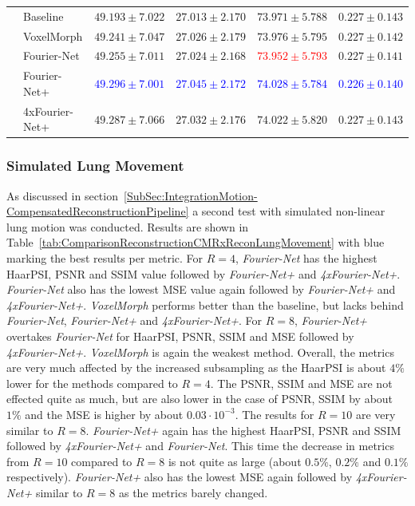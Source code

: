 \begin{table}[H]
\begin{tabularx}{\textwidth}{c Y Y Y Y Y}
		\midrule		
		 & Baseline & $49.193 \pm 7.022$ & $27.013 \pm 2.170$ & $73.971 \pm 5.788$ & $0.227 \pm 0.143$ \\  
		 & VoxelMorph & $49.241 \pm 7.047$ & $27.026 \pm 2.179$ & $73.976 \pm 5.795$ & $0.227 \pm 0.142$ \\  
		 & Fourier-Net & $49.255 \pm 7.011$ & $27.024 \pm 2.168$ & \textcolor{red}{$73.952 \pm 5.793$} & $0.227 \pm 0.141$ \\  
		 & Fourier-Net+ & \textcolor{blue}{$49.296 \pm 7.001$} & \textcolor{blue}{$27.045 \pm 2.172$} & \textcolor{blue}{$74.028 \pm 5.784$} & \textcolor{blue}{$0.226 \pm 0.140$} \\   
		 & \mbox{4xFourier-Net+} & $49.287 \pm 7.066$ & $27.032 \pm 2.176$ & $74.022 \pm 5.820$ & $0.227 \pm 0.143$ \\ 
		 \bottomrule
	\end{tabularx}
\end{table}


\subsubsection{Simulated Lung Movement}
As discussed in section~\ref{SubSec:IntegrationMotion-CompensatedReconstructionPipeline} a second test with simulated non-linear lung motion was conducted. Results are shown in Table~\ref{tab:ComparisonReconstructionCMRxReconLungMovement} with blue marking the best results per metric. For $R=4$, \emph{Fourier-Net} has the highest HaarPSI, PSNR and SSIM value followed by \emph{Fourier-Net+} and \emph{4xFourier-Net+}. \emph{Fourier-Net} also has the lowest MSE value again followed by \emph{Fourier-Net+} and \emph{4xFourier-Net+}. \emph{VoxelMorph} performs better than the baseline, but lacks behind \emph{Fourier-Net}, \emph{Fourier-Net+} and \emph{4xFourier-Net+}. For $R=8$, \emph{Fourier-Net+} overtakes \emph{Fourier-Net} for HaarPSI, PSNR, SSIM and MSE followed by \emph{4xFourier-Net+}. \emph{VoxelMorph} is again the weakest method. Overall, the metrics are very much affected by the increased subsampling as the HaarPSI is about $4 \%$ lower for the methods compared to $R=4$. The PSNR, SSIM and MSE are not effected quite as much, but are also lower in the case of PSNR, SSIM by about $1 \%$ and the MSE is higher by about $0.03 \cdot 10^{-3}$. The results for $R=10$ are very similar to $R=8$. \emph{Fourier-Net+} again has the highest HaarPSI, PSNR and SSIM followed by \emph{4xFourier-Net+} and \emph{Fourier-Net}. This time the decrease in metrics from $R=10$ compared to $R=8$ is not quite as large (about $0.5 \%$, $0.2 \%$ and $0.1 \%$ respectively). \emph{Fourier-Net+} also has the lowest MSE again followed by \emph{4xFourier-Net+} similar to $R=8$ as the metrics barely changed.

